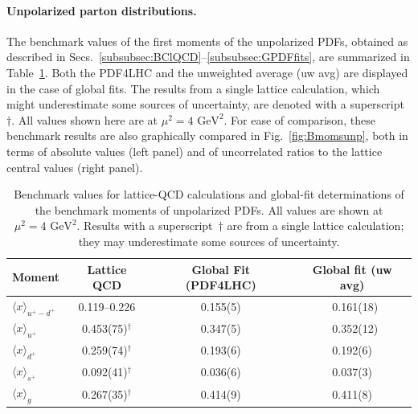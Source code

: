 \paragraph{Unpolarized parton distributions.}
%
The benchmark values of the first moments of the unpolarized PDFs, obtained
as described in Secs.~\ref{subsubsec:BClQCD}--\ref{subsubsec:GPDFfits}, 
are summarized in Table~\ref{tab:BMunp}.
%
Both the PDF4LHC and the unweighted average (uw avg) are displayed in the case 
of global fits.
%
The results from a single lattice calculation, which might underestimate some 
sources of uncertainty, are denoted with a superscript~$\dagger$.
%
All values shown here are at $\mu^2=4\mbox{ GeV}^2$.
%
For ease of comparison, these benchmark results are also graphically
compared in Fig.~\ref{fig:Bmomsunp}, both in terms of absolute values 
(left panel) and of uncorrelated ratios to the lattice central values 
(right panel).

\begin{table}[!t]
\centering
\renewcommand{\arraystretch}{1.2}
\begin{tabular}{lccc}
\toprule
Moment & Lattice QCD & Global Fit (PDF4LHC) & Global fit (uw avg)\\
\midrule
$\langle x \rangle_{u^+ -d^+}$ 
& \numrange{0.119}{0.226} 
& 0.155(5)
& \, 0.161(18)\\
$\langle x \rangle_{u^+}$     
& 0.453(75)$^\dagger$ 
& 0.347(5)
& \, 0.352(12)\\
$\langle x \rangle_{d^+}$     
& 0.259(74)$^\dagger$ 
& 0.193(6)
& 0.192(6)\\
$\langle x \rangle_{s^+}$     
& 0.092(41)$^\dagger$ 
& 0.036(6)
& 0.037(3)\\
$\langle x\rangle_{g}$       
& 0.267(35)$^\dagger$ 
& 0.414(9)
& 0.411(8)\\
\bottomrule
\end{tabular}
\caption{\small Benchmark values for lattice-QCD calculations and global-fit 
determinations of the benchmark moments of unpolarized PDFs.
%
All values are shown at $\mu^2=4\mbox{ GeV}^2$.
%
Results with a superscript~$\dagger$ are from a single lattice 
calculation; they may underestimate some sources of uncertainty.}
\label{tab:BMunp}
\end{table}

